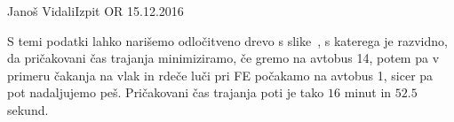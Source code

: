 \begin{naloga}{Janoš Vidali}{Izpit OR 15.12.2016}
\begin{odgovor}
S temi podatki lahko narišemo odločitveno drevo s slike~,
s katerega je razvidno, da pričakovani čas trajanja minimiziramo,
če gremo na avtobus 14,
potem pa v primeru čakanja na vlak in rdeče luči pri FE počakamo na avtobus 1,
sicer pa pot nadaljujemo peš.
Pričakovani čas trajanja poti je tako $16$ minut in $52.5$ sekund.

\begin{slika}
\end{slika}
\end{odgovor}
\end{naloga}
